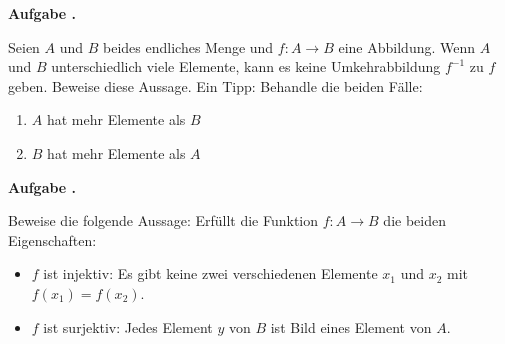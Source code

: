 \documentclass[a4paper,ngerman,12pt]{scrartcl}
\theoremstyle{definition}
\theoremstyle{plain}
\theoremstyle{remark}
\newlength{\aufgabenskip}
\newcounter{aufgabennummer}
\newenvironment{aufgabe}[1]{
  \addtocounter{aufgabennummer}{1}
  \textbf{Aufgabe \theaufgabennummer.} \emph{#1} \par
}{\vspace{\aufgabenskip}}
\begin{document}
\begin{aufgabe}\\
Seien $A$ und $B$ beides endliches Menge und $f:A\longrightarrow B$ eine Abbildung. Wenn $A$ und $B$ unterschiedlich viele Elemente, kann es keine Umkehrabbildung $f^{-1}$ zu $f$ geben.
Beweise diese Aussage. Ein Tipp: Behandle die beiden Fälle:
\begin{enumerate}
\item $A$ hat mehr Elemente als $B$
\item $B$ hat mehr Elemente als $A$
\end{enumerate}
\end{aufgabe}

\begin{aufgabe}\\
Beweise die folgende Aussage: 
Erfüllt die Funktion $f:A\longrightarrow B$ die beiden Eigenschaften:
\begin{itemize}
\item $f$ ist injektiv: Es gibt keine zwei verschiedenen Elemente $x_1$ und $x_2$ mit $f(x_1)=f(x_2)$.
\item $f$ ist surjektiv: Jedes Element $y$ von $B$ ist Bild eines Element von $A$.
\end{itemize}
\end{aufgabe}
\end{document}
